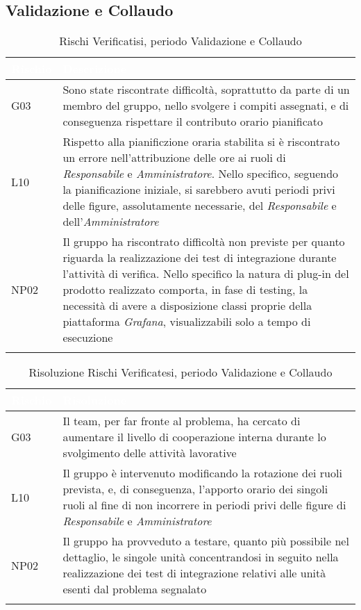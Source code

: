 \subsection{Validazione e Collaudo}\label{ARCollaudo}
\begin{longtable}{|C{.15\textwidth}|C{.79\textwidth}|}
	\hline
	\textbf{\textcolor{white}{Rischio}} & \textbf{\textcolor{white}{Descrizione}} \\
	\hline \hline
	\endfirsthead
	G03 & Sono state riscontrate difficoltà, soprattutto da parte di un membro del gruppo, nello svolgere i compiti assegnati, e di conseguenza rispettare il contributo orario pianificato\\ 
	\hline
	L10 & Rispetto alla pianificzione oraria stabilita si è riscontrato un errore nell'attribuzione delle ore ai ruoli di \textit{Responsabile} e \textit{Amministratore}. Nello specifico, seguendo la pianificazione iniziale, si sarebbero avuti periodi privi delle figure, assolutamente necessarie, del \textit{Responsabile} e dell'\textit{Amministratore}\\
	\hline
	NP02 & Il gruppo ha riscontrato difficoltà non previste per quanto riguarda la realizzazione dei test di integrazione durante l'attività di verifica. Nello specifico la natura di plug-in del prodotto realizzato comporta, in fase di testing, la necessità di avere a disposizione classi proprie della piattaforma \textit{Grafana}, visualizzabili solo a tempo di esecuzione\\
	\hline
	\caption{Rischi Verificatisi, periodo Validazione e Collaudo}
	\label{tab:analisiRischiRA}
\end{longtable}

\begin{longtable}{|C{.15\textwidth}|C{.79\textwidth}|}
	\hline
	\textbf{\textcolor{white}{Rischio}} & \textbf{\textcolor{white}{Risoluzione}} \\
	\hline \hline
	\endfirsthead
	G03 & Il team, per far fronte al problema, ha cercato di aumentare il livello di cooperazione interna durante lo svolgimento delle attività lavorative\\ 
	\hline
	L10 & Il gruppo è intervenuto modificando la rotazione dei ruoli prevista, e, di conseguenza, l'apporto orario dei singoli ruoli al fine di non incorrere in periodi privi delle figure di \textit{Responsabile} e \textit{Amministratore}\\
	\hline
	NP02 & Il gruppo ha provveduto a testare, quanto più possibile nel dettaglio, le singole unità concentrandosi in seguito nella realizzazione dei test di integrazione relativi alle unità esenti dal problema segnalato\\
	\hline
	\caption{Risoluzione Rischi Verificatesi, periodo Validazione e Collaudo}
	\label{tab:risoluzioneRischiRA}
\end{longtable}


